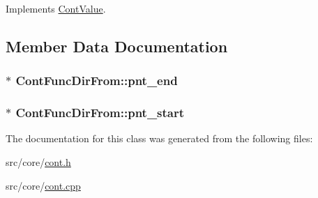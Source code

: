 Implements \hyperlink{a00086_ae3ce98084899bf1a873a1ec6bf15116e}{Cont\-Value}.



\subsection{Member Data Documentation}
\hypertarget{a00053_a3d16a2d6d1a2b702c628fc988ac1d541}{
\subsubsection[{pnt\-\_\-end}]{ $\ast$ Cont\-Func\-Dir\-From\-::pnt\-\_\-end\hspace{0.3cm}{\ttfamily [private]}}}\label{a00053_a3d16a2d6d1a2b702c628fc988ac1d541}
\hypertarget{a00053_a057385fa5f34bec3e9691e3a7a9a6b9a}{
\subsubsection[{pnt\-\_\-start}]{$\ast$ Cont\-Func\-Dir\-From\-::pnt\-\_\-start\hspace{0.3cm}{\ttfamily [private]}}}\label{a00053_a057385fa5f34bec3e9691e3a7a9a6b9a}


The documentation for this class was generated from the following files\-:\begin{DoxyCompactItemize}
\item 
src/core/\hyperlink{a00218}{cont.\-h}\item 
src/core/\hyperlink{a00217}{cont.\-cpp}\end{DoxyCompactItemize}
